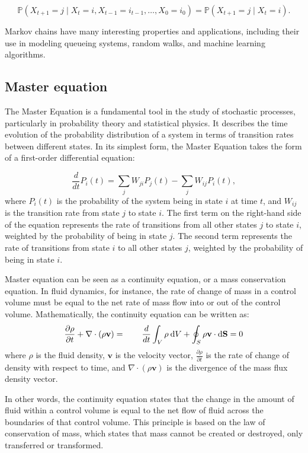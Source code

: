 \begin{equation*}
    \mathbb{P}(X_{t+1} = j \mid X_t = i, X_{t-1} = i_{t-1}, \ldots, X_0 = i_0) = \mathbb{P}(X_{t+1} = j \mid X_t = i).
\end{equation*}

Markov chains have many interesting properties and applications, including their use in modeling queueing systems, random walks, and machine learning algorithms.


\subsection*{Master equation}

The Master Equation is a fundamental tool in the study of stochastic processes, particularly in probability theory and statistical physics. It describes the time evolution of the probability distribution of a system in terms of transition rates between different states. In its simplest form, the Master Equation takes the form of a first-order differential equation:

\begin{equation}
    \frac{d}{dt} P_i(t) = \sum_j W_{ji} P_j(t) - \sum_j W_{ij} P_i(t),
\end{equation}
where $P_i(t)$ is the probability of the system being in state $i$ at time $t$, and $W_{ij}$ is the transition rate from state $j$ to state $i$. The first term on the right-hand side of the equation represents the rate of transitions from all other states $j$ to state $i$, weighted by the probability of being in state $j$. The second term represents the rate of transitions from state $i$ to all other states $j$, weighted by the probability of being in state $i$.

Master equation can be seen as a continuity equation, or a mass conservation equation. In fluid dynamics, for instance, the rate of change of mass in a control volume must be equal to the net rate of mass flow into or out of the control volume. Mathematically, the continuity equation can be written as:
$$\frac{\partial \rho}{\partial t} + \nabla \cdot (\rho \mathbf{v}) = \qquad \frac{d}{dt} \int_V   \rho \: \mathrm{d} V +  \oint_S  \rho \mathbf{v} \cdot \mathrm{d} \mathbf{S} = 0$$
where $\rho$ is the fluid density, $\mathbf{v}$ is the velocity vector, $\frac{\partial \rho}{\partial t}$ is the rate of change of density with respect to time, and $\nabla \cdot (\rho \mathbf{v})$ is the divergence of the mass flux density vector.

In other words, the continuity equation states that the change in the amount of fluid within a control volume is equal to the net flow of fluid across the boundaries of that control volume. This principle is based on the law of conservation of mass, which states that mass cannot be created or destroyed, only transferred or transformed.

